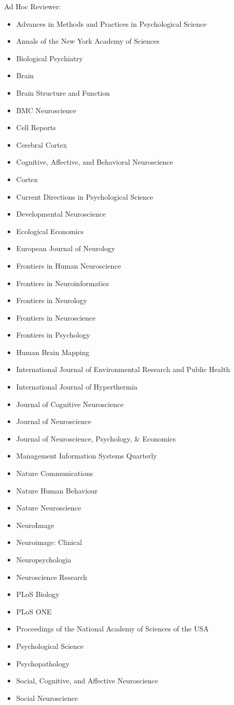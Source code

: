 \documentclass[11pt, letterpaper]{article}
\begin{document}
\pagebreak
Ad Hoc Reviewer:
\begin{multicols}{2}
\begin{itemize}[noitemsep]
\itshape
\item Advances in Methods and Practices in Psychological Science
\item Annals of the New York Academy of Sciences
\item Biological Psychiatry
\item Brain
\item Brain Structure and Function
\item BMC Neuroscience 
\item Cell Reports
\item Cerebral Cortex 
\item Cognitive, Affective, and Behavioral Neuroscience 
\item Cortex
\item Current Directions in Psychological Science
\item Developmental Neuroscience 
\item Ecological Economics
\item European Journal of Neurology
\item Frontiers in Human Neuroscience 
\item Frontiers in Neuroinformatics 
\item Frontiers in Neurology 
\item Frontiers in Neuroscience 
\item Frontiers in Psychology 
\item Human Brain Mapping 
\item International Journal of Environmental Research and Public Health
\item International Journal of Hyperthermia 
\item Journal of Cognitive Neuroscience 
\item Journal of Neuroscience 
\item Journal of Neuroscience, Psychology, \& Economics
\item Management Information Systems Quarterly 
\item Nature Communications 
\item Nature Human Behaviour 
\item Nature Neuroscience
\item NeuroImage 
\item Neuroimage: Clinical 
\item Neuropsychologia 
\item Neuroscience Research 
\item PLoS Biology 
\item PLoS ONE 
\item Proceedings of the National Academy of Sciences of the USA
\item Psychological Science 
\item Psychopathology 
\item Social, Cognitive, and Affective Neuroscience 
\item Social Neuroscience
\end{itemize}
\end{multicols}
\end{document}
